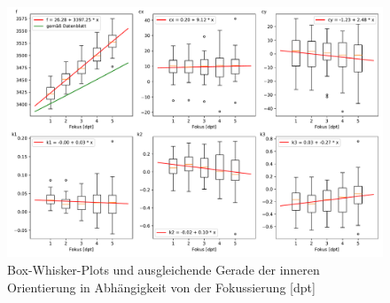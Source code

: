 \documentclass[./00PhotoBox.tex]{subfiles}
\begin{document}
\begin{figure}
  \centering
  \includegraphics[width=1\textwidth]{./img/naeherungswerte_diagramm.pdf}
  \caption{Box-Whisker-Plots und ausgleichende Gerade der inneren Orientierung in Abhängigkeit von der Fokussierung [dpt]} %
  \label{img:naeherungswerte} %
\end{figure}

\biblio
\end{document}
